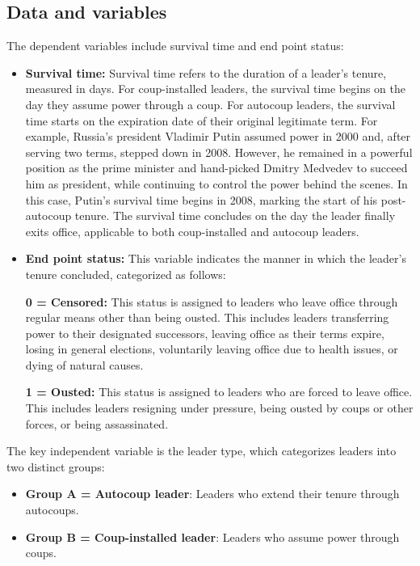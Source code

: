 \documentclass[
  12pt,
]{report}
\providecommand{\tightlist}{%
  \setlength{\itemsep}{0pt}\setlength{\parskip}{0pt}}\usepackage{longtable,booktabs,array}
\begin{document}
\subsection{Data and variables}\label{data-and-variables}

The dependent variables include survival time and end point status:

\begin{itemize}
\item
  \textbf{Survival time:} Survival time refers to the duration of a
  leader's tenure, measured in days. For coup-installed leaders, the
  survival time begins on the day they assume power through a coup. For
  autocoup leaders, the survival time starts on the expiration date of
  their original legitimate term. For example, Russia's president
  Vladimir Putin assumed power in 2000 and, after serving two terms,
  stepped down in 2008. However, he remained in a powerful position as
  the prime minister and hand-picked Dmitry Medvedev to succeed him as
  president, while continuing to control the power behind the scenes. In
  this case, Putin's survival time begins in 2008, marking the start of
  his post-autocoup tenure. The survival time concludes on the day the
  leader finally exits office, applicable to both coup-installed and
  autocoup leaders.
\item
  \textbf{End point status:} This variable indicates the manner in which
  the leader's tenure concluded, categorized as follows:

  \textbf{0 = Censored:} This status is assigned to leaders who leave
  office through regular means other than being ousted. This includes
  leaders transferring power to their designated successors, leaving
  office as their terms expire, losing in general elections, voluntarily
  leaving office due to health issues, or dying of natural causes.

  \textbf{1 = Ousted:} This status is assigned to leaders who are forced
  to leave office. This includes leaders resigning under pressure, being
  ousted by coups or other forces, or being assassinated.
\end{itemize}

The key independent variable is the leader type, which categorizes
leaders into two distinct groups:

\begin{itemize}
\tightlist
\item
  \textbf{Group A = Autocoup leader}: Leaders who extend their tenure
  through autocoups.
\item
  \textbf{Group B = Coup-installed leader}: Leaders who assume power
  through coups.
\end{itemize}
\end{document}
